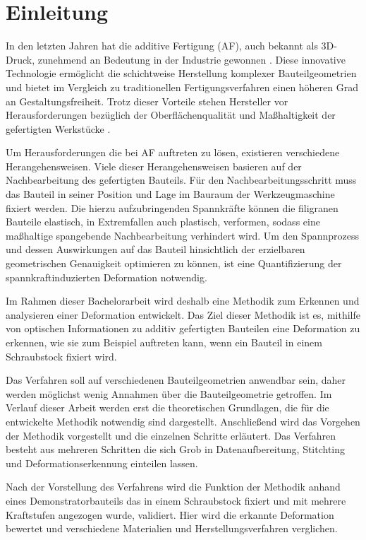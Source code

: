 \chapter{Einleitung}

In den letzten Jahren hat die additive Fertigung (AF), auch bekannt als 3D-Druck, 
zunehmend an Bedeutung in der Industrie gewonnen \cite{JADHAV20222094}. 
Diese innovative Technologie 
ermöglicht die schichtweise Herstellung komplexer Bauteilgeometrien und bietet im 
Vergleich zu traditionellen Fertigungsverfahren einen höheren Grad an 
Gestaltungsfreiheit. Trotz dieser Vorteile stehen Hersteller vor 
Herausforderungen bezüglich der Oberflächenqualität und Maßhaltigkeit 
der gefertigten Werkstücke \cite{SCHNECK201919}.

Um Herausforderungen die bei AF auftreten zu lösen, existieren 
verschiedene Herangehensweisen. Viele dieser Herangehensweisen basieren 
auf der Nachbearbeitung des gefertigten Bauteils.
Für den Nachbearbeitungsschritt muss das Bauteil in seiner Position und Lage im Bauraum
der Werkzeugmaschine fixiert werden. Die hierzu aufzubringenden Spannkräfte 
können die filigranen Bauteile elastisch, in Extremfallen auch plastisch, verformen, 
sodass eine maßhaltige spangebende Nachbearbeitung verhindert wird. 
Um den Spannprozess und dessen Auswirkungen auf das Bauteil hinsichtlich 
der erzielbaren geometrischen Genauigkeit optimieren zu
können, ist eine Quantifizierung der spannkraftinduzierten Deformation notwendig. 
\cite{newMethod}

Im Rahmen dieser Bachelorarbeit wird deshalb eine Methodik zum Erkennen und 
analysieren einer Deformation entwickelt. Das Ziel dieser Methodik ist es, 
mithilfe von optischen Informationen zu additiv gefertigten Bauteilen eine 
Deformation zu erkennen, wie sie zum Beispiel auftreten kann, wenn ein Bauteil 
in einem Schraubstock fixiert wird.

Das Verfahren soll auf verschiedenen Bauteilgeometrien anwendbar sein, daher werden 
möglichst wenig Annahmen über die Bauteilgeometrie getroffen.
Im Verlauf dieser Arbeit werden erst die theoretischen Grundlagen, die für die 
entwickelte Methodik notwendig sind dargestellt. 
Anschließend wird das Vorgehen der Methodik vorgestellt und die einzelnen 
Schritte erläutert. Das Verfahren besteht aus mehreren Schritten die sich Grob in 
Datenaufbereitung, Stitchting und Deformationserkennung einteilen lassen.

Nach der Vorstellung des Verfahrens wird die Funktion der Methodik anhand eines 
Demonstratorbauteils das in einem Schraubstock fixiert und mit mehrere Kraftstufen 
angezogen wurde, validiert. Hier wird die erkannte Deformation bewertet und 
verschiedene Materialien und Herstellungsverfahren verglichen.

